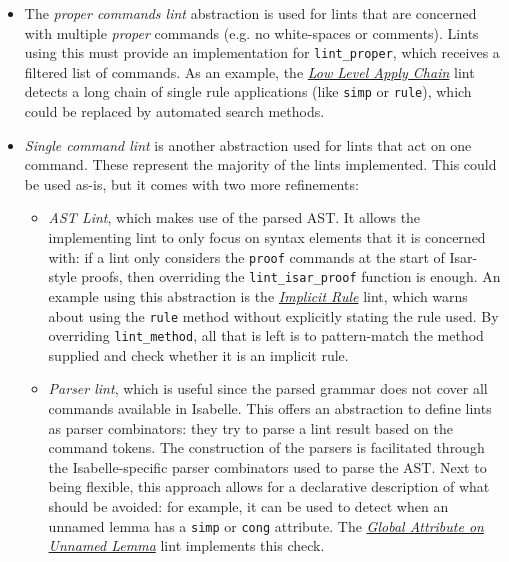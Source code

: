 \begin{itemize}
    \item The \textit{proper commands lint} abstraction is used for
    lints that are concerned with multiple \textit{proper} commands 
    (e.g. no white-spaces or comments).
    Lints using this must provide an implementation for
    \texttt{lint\_proper}, which receives a filtered list of commands. As an
    example, the \hyperref[lint:lowlevel]{\textit{Low Level Apply Chain}} lint detects a long
    chain of single rule applications (like \texttt{simp} or 
    \texttt{rule}), which could be replaced by automated search methods.
    
    \item \textit{Single command lint} is another abstraction used
    for lints that act on one
    command. These represent the majority of the lints implemented.
    This could be used as-is, but it comes with two more refinements:
        \begin{itemize}
            \item \textit{AST Lint}, which makes use of the parsed
            AST. It allows the implementing lint to
            only focus on syntax elements that it is
            concerned with: if a lint only
            considers the \texttt{proof} commands at the start of 
            Isar-style proofs, then overriding the
            \texttt{lint\_isar\_proof} function is enough.
            An example using this abstraction is the \hyperref[lint:implicitrule]{\textit{Implicit Rule}} 
            lint, which warns about using the \texttt{rule} method without explicitly
            stating the rule used. By overriding \texttt{lint\_method},
            all that is left is to pattern-match the method supplied and
            check whether it is an implicit rule. 
            \item \textit{Parser lint}, which is useful since the parsed grammar
            does not cover all commands available in Isabelle. This offers an
            abstraction to define lints as parser combinators:
            they try to parse a lint result based on the command tokens. The 
            construction of the parsers is facilitated through the 
            Isabelle-specific parser combinators used to parse the AST.
            Next to being flexible, this approach allows for a
            declarative description of what should be avoided:
            for example, it can be used to detect when an unnamed lemma has a 
            \texttt{simp} or \texttt{cong} attribute. The
            \hyperref[lint:globalattr]{\textit{Global Attribute on Unnamed Lemma}} 
            lint implements this check.
        \end{itemize}
\end{itemize}

